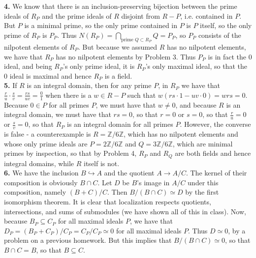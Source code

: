 \documentclass[11pt]{article}
\newcommand{\num}[1]{\noindent \textbf{#1}}
\theoremstyle{definition}
\begin{document}
\num{4.} We know that there is an inclusion-preserving bijection between the prime ideals of $R_P$ and the prime ideals of $R$ disjoint from $R-P$, i.e. contained in $P$. But $P$ is a minimal prime, so the only prime contained in $P$ is $P$ itself, so the only prime of $R_P$ is $P_P$. Thus $N(R_P)=\bigcap_{\text{prime } Q\subset R_P} Q = P_P$, so $P_P$ consists of the nilpotent elements of $R_P$. But because we assumed $R$ has no nilpotent elements, we have that $R_P$ has no nilpotent elements by Problem 3. Thus $P_P$ is in fact the 0 ideal, and being $R_P$'s only prime ideal, it is $R_P$'s only maximal ideal, so that the 0 ideal is maximal and hence $R_P$ is a field.     \\

\num{5.} If $R$ is an integral domain, then for any prime $P$, in $R_P$ we have that $\frac{r}{u}\cdot\frac{s}{v}=\frac{rs}{uv}=\frac{0}{1}$ when there is a $w\in R-P$ such that $w(rs\cdot1-uv\cdot0)=wrs=0$. Because $0\in P$ for all primes $P$, we must have that $w\neq0$, and because $R$ is an integral domain, we must have that $rs=0$, so that $r=0$ or $s=0$, so that $\frac{r}{u}=0$ or $\frac{s}{v}=0$, so that $R_P$ is an integral domain for all primes $P$. However, the converse is false - a counterexample is $R=\mathbb{Z}/6\mathbb{Z}$, which has no nilpotent elements and whose only prime ideals are $P=2\mathbb{Z}/6\mathbb{Z}$ and $Q=3\mathbb{Z}/6\mathbb{Z}$, which are minimal primes by inspection, so that by Problem 4, $R_P$ and $R_Q$ are both fields and hence integral domains, while $R$ itself is not.    \\

\num{6.} We have the inclusion $B\hookrightarrow A$ and the quotient $A\rightarrow A/C$. The kernel of their composition is obviously $B\cap C$. Let $D$ be $B$'s image in $A/C$ under this composition, namely $(B+C)/C$. Then $B/(B\cap C)\simeq D$ by the first isomorphism theorem. It is clear that localization respects quotients, intersections, and sums of submodules (we have shown all of this in class). Now, because $B_P\subseteq C_P$ for all maximal ideals $P$, we have that $D_P=(B_P+C_P)/C_P=C_P/C_P\simeq0$ for all maximal ideals $P$. Thus $D\simeq 0$, by a problem on a previous homework. But this implies that $B/(B\cap C)\simeq 0$, so that $B\cap C= B$, so that $B\subseteq C$.   \\
\end{document}
